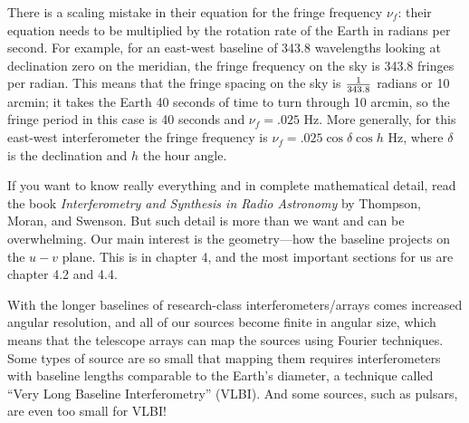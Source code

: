 \documentclass[11pt,preprint]{aastex}
\begin{document}
	There is a scaling mistake in their equation for the fringe
frequency $\nu_f$: their equation needs to be multiplied by the rotation
rate of the Earth in radians per second.  For example, for an east-west
baseline of 343.8 wavelengths looking at declination zero on the
meridian, the fringe frequency on the sky is 343.8 fringes per radian. 
This means that the fringe spacing on the sky is ${1 \over 343.8}$
radians or 10 arcmin; it takes the Earth 40 seconds of time to turn
through 10 arcmin, so the fringe period in this case is 40 seconds and
$\nu_f = .025$ Hz.  More generally, for this east-west interferometer
the fringe frequency is $\nu_f = .025 \cos \delta \cos h$ Hz, where
$\delta$ is the declination and $h$ the hour angle. 

	If you want to know really everything and in complete
mathematical detail, read the book {\it Interferometry and Synthesis in
Radio Astronomy} by Thompson, Moran, and Swenson.  But such detail is
more than we want and can be overwhelming.  Our main interest is the
geometry---how the baseline projects on the $u-v$ plane.  This is in
chapter 4, and the most important sections for us are chapter 4.2 and
4.4. 

With the longer baselines of research-class interferometers/arrays comes
increased angular resolution, and all of our sources become finite in
angular size, which means that the telescope arrays can map the sources
using Fourier techniques. Some types of source are so small that mapping
them requires interferometers with baseline lengths comparable to the
Earth's diameter, a technique called ``Very Long Baseline
Interferometry'' (VLBI). And some sources, such as pulsars, are even too
small for VLBI!
\end{document}
